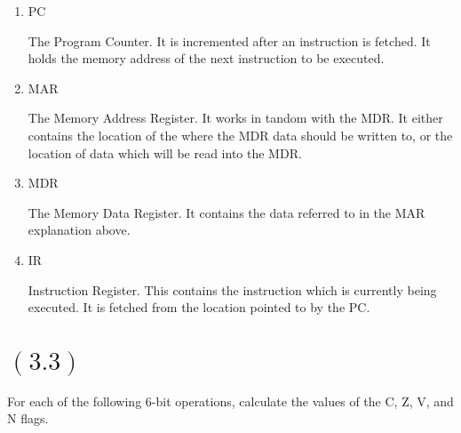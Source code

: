 \documentclass[letterpaper,12pt,titlepage]{article}
\begin{document}
\renewcommand{\labelenumi}{\alph{enumi})}
\begin{enumerate}
\item PC

\begin{mdframed}[style=MyFrame]

The Program Counter. It is incremented after an instruction is fetched. It holds the memory address of the next instruction to be executed.

\end{mdframed}

\item MAR

\begin{mdframed}[style=MyFrame]

The Memory Address Register. It works in tandom with the MDR. It either contains the location of the where the MDR data should be written to, or the location of data which will be read into the MDR.

\end{mdframed}

\item MDR 

\begin{mdframed}[style=MyFrame]

The Memory Data Register. It contains the data referred to in the MAR explanation above.

\end{mdframed}

\item IR

\begin{mdframed}[style=MyFrame]

Instruction Register. This contains the instruction which is currently being executed. It is fetched from the location pointed to by the PC.

\end{mdframed}

\end{enumerate}

\section*{$(3.3)$} For each of the following 6-bit operations, calculate the values of the C, Z, V, and N flags.
\end{document}

